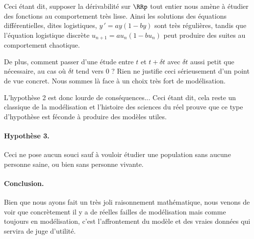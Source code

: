 \smallskip

Ceci étant dit, supposer la dérivabilité sur $\RRp$ tout entier nous amène à étudier des fonctions au comportement très lisse.
Ainsi les solutions des équations différentielles, dites logistiques, $y\,' = a y (1 - b y)$ sont très régulières, tandis que l'équation logistique discrète $u_{n+1} = a u_n (1 - b u_n)$ peut produire des suites au comportement chaotique. 

\smallskip

De plus, comment passer d'une étude entre $t$ et $t + \delta t$ avec $\delta t$ aussi petit que nécessaire, au cas où $\delta t$ tend vers $0$ ? Rien ne justifie ceci sérieusement d'un point de vue concret. Nous sommes là face à un choix très fort de modélisation.

\smallskip

L'hypothèse 2 est donc lourde de conséquences... Ceci étant dit, cela reste un classique de la modélisation et l'histoire des sciences du réel prouve que ce type d'hypothèse est féconde à produire des modèles utiles.




\paragraph{Hypothèse 3.} Ceci ne pose aucun souci sauf à vouloir étudier une population sans aucune personne saine, ou bien sans personne vivante.




\paragraph{Conclusion.} Bien que nous ayons fait un très joli raisonnement mathématique, nous venons de voir que concrètement il y a de réelles failles de modélisation mais comme toujours en modélisation, c'est l'affrontement du modèle et des vraies données qui servira de juge d'utilité.